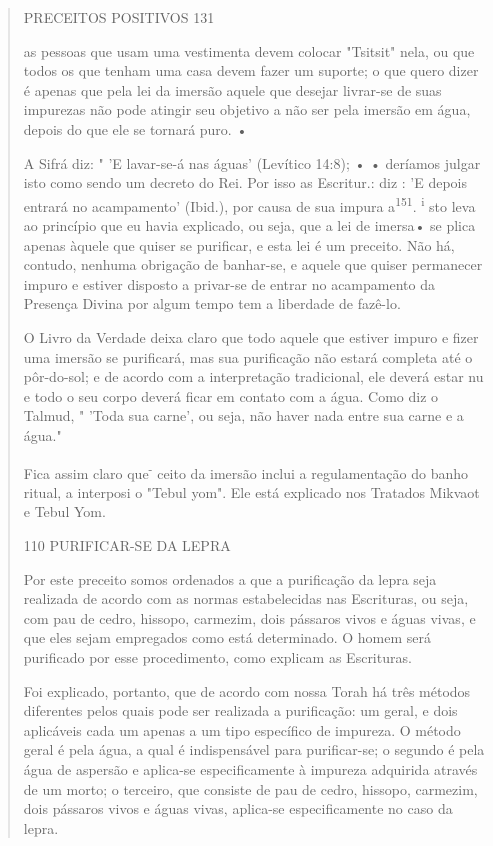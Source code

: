 \begin{quote}
PRECEITOS POSITIVOS 131

as pessoas que usam uma vestimenta devem colocar "Tsitsit" nela, ou que
to­dos os que tenham uma casa devem fazer um suporte; o que quero dizer
é ape­nas que pela lei da imersão aquele que desejar livrar-se de suas
impurezas não pode atingir seu objetivo a não ser pela imersão em água,
depois do que ele se tornará puro. •

A Sifrá diz: " 'E lavar-se-á nas águas' (Levítico 14:8); • • deríamos
jul­gar isto como sendo um decreto do Rei. Por isso as Escritur.: diz :
'E depois entrará no acampamento' (Ibid.), por causa de sua impura
a\textsuperscript{151}. \textsuperscript{i} sto leva ao princípio que eu
havia explicado, ou seja, que a lei de imersa• se plica apenas àquele
que quiser se purificar, e esta lei é um preceito. Não há, contudo,
ne­nhuma obrigação de banhar-se, e aquele que quiser permanecer impuro e
esti­ver disposto a privar-se de entrar no acampamento da Presença
Divina por al­gum tempo tem a liberdade de fazê-lo.

O Livro da Verdade deixa claro que todo aquele que estiver impuro e
fizer uma imersão se purificará, mas sua purificação não estará completa
até o pôr-do-sol; e de acordo com a interpretação tradicional, ele
deverá estar nu e todo o seu corpo deverá ficar em contato com a água.
Como diz o Talmud, " 'Toda sua carne', ou seja, não haver nada entre sua
carne e a água."

Fica assim claro que\textsuperscript{-} ceito da imersão inclui a
regulamenta­ção do banho ritual, a interposi o "Tebul yom". Ele está
explicado nos Tratados Mikvaot e Tebul Yom.

110 PURIFICAR-SE DA LEPRA

Por este preceito somos ordenados a que a purificação da lepra seja
realizada de acordo com as normas estabelecidas nas Escrituras, ou seja,
com pau de cedro, hissopo, carmezim, dois pássaros vivos e águas vivas,
e que eles sejam empregados como está determinado. O homem será
purificado por esse procedimento, como explicam as Escrituras.

Foi explicado, portanto, que de acordo com nossa Torah há três mé­todos
diferentes pelos quais pode ser realizada a purificação: um geral, e
dois aplicáveis cada um apenas a um tipo específico de impureza. O
método geral é pela água, a qual é indispensável para purificar-se; o
segundo é pela água de aspersão e aplica-se especificamente à impureza
adquirida através de um mor­to; o terceiro, que consiste de pau de
cedro, hissopo, carmezim, dois pássaros vivos e águas vivas, aplica-se
especificamente no caso da lepra.


\end{quote}

